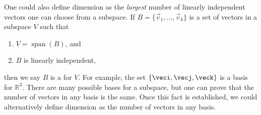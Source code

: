\smallskip


\smallskip

One could also define dimension as the \textit{largest} number of linearly independent vectors one can choose from a subspace. If $B=\{\vec{v}_1, \ldots, \vec{v}_k\}$ is a set of vectors in a subspace $V$ such that 
\begin{enumerate}
\item $V=\operatorname{span}(B)$, and
\item $B$ is linearly independent,
\end{enumerate}
then we say $B$ is a  for $V$. For example, the set $\{\veci, \vecj, \veck\}$ is a basis for $\mathbb{R}^3$. There are many possible bases for a subspace, but one can prove that the number of vectors in any basis is the same. Once this fact is established, we could alternatively define dimension as the number of vectors in any basis.

